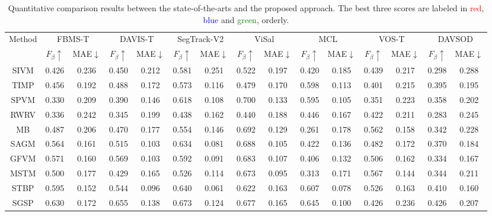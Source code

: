 \documentclass[12pt]{article}
\begin{document}
\begin{table}[]
\label{compare_all}
\scriptsize
\center
\caption{Quantitative comparison results between the state-of-the-arts and the proposed approach. The best three scores are labeled in \textcolor{red}{red}, \textcolor{blue}{blue} and \textcolor{green}{green}, orderly.}
\begin{tabular}{|c|c|c|c|c|c|c|c|c|c|c|c|c|c|c|}
\hline
\multirow{2}{*}{Method} & \multicolumn{2}{c|}{FBMS-T} & \multicolumn{2}{c|}{DAVIS-T} & \multicolumn{2}{c|}{SegTrack-V2} & \multicolumn{2}{c|}{ViSal} & \multicolumn{2}{c|}{MCL} & \multicolumn{2}{c|}{VOS-T} & \multicolumn{2}{c|}{DAVSOD} \\ \cline{2-15} 
 & $F_\beta\uparrow$ & MAE$\downarrow$ & $F_\beta\uparrow$ & MAE$\downarrow$ & $F_\beta\uparrow$ & MAE$\downarrow$ & $F_\beta\uparrow$ & MAE$\downarrow$ & $F_\beta\uparrow$ & MAE$\downarrow$ & $F_\beta\uparrow$ & MAE$\downarrow$ & $F_\beta\uparrow$ & MAE$\downarrow$ \\ \hline
SIVM & 0.426 & 0.236 & 0.450 & 0.212 & 0.581 & 0.251 & 0.522 & 0.197 & 0.420 & 0.185 & 0.439 & 0.217 & 0.298 & 0.288 \\ \hline
TIMP & 0.456 & 0.192 & 0.488 & 0.172 & 0.573 & 0.116 & 0.479 & 0.170 & 0.598 & 0.113 & 0.401 & 0.215 & 0.395 & 0.195 \\ \hline
SPVM & 0.330 & 0.209 & 0.390 & 0.146 & 0.618 & 0.108 & 0.700 & 0.133 & 0.595 & 0.105 & 0.351 & 0.223 & 0.358 & 0.202 \\ \hline
RWRV & 0.336 & 0.242 & 0.345 & 0.199 & 0.438 & 0.162 & 0.440 & 0.188 & 0.446 & 0.167 & 0.422 & 0.211 & 0.283 & 0.245 \\ \hline
MB & 0.487 & 0.206 & 0.470 & 0.177 & 0.554 & 0.146 & 0.692 & 0.129 & 0.261 & 0.178 & 0.562 & 0.158 & 0.342 & 0.228 \\ \hline
SAGM & 0.564 & 0.161 & 0.515 & 0.103 & 0.634 & 0.081 & 0.688 & 0.105 & 0.422 & 0.136 & 0.482 & 0.172 & 0.370 & 0.184 \\ \hline
GFVM & 0.571 & 0.160 & 0.569 & 0.103 & 0.592 & 0.091 & 0.683 & 0.107 & 0.406 & 0.132 & 0.506 & 0.162 & 0.334 & 0.167 \\ \hline
MSTM & 0.500 & 0.177 & 0.429 & 0.165 & 0.526 & 0.114 & 0.673 & 0.095 & 0.313 & 0.171 & 0.567 & 0.144 & 0.344 & 0.211 \\ \hline
STBP & 0.595 & 0.152 & 0.544 & 0.096 & 0.640 & 0.061 & 0.622 & 0.163 & 0.607 & 0.078 & 0.526 & 0.163 & 0.410 & 0.160 \\ \hline
SGSP & 0.630 & 0.172 & 0.655 & 0.138 & 0.673 & 0.124 & 0.677 & 0.165 & 0.645 & 0.100 & 0.426 & 0.236 & 0.426 & 0.207 \\ \hline

\end{tabular}
\end{table}
\end{document}
